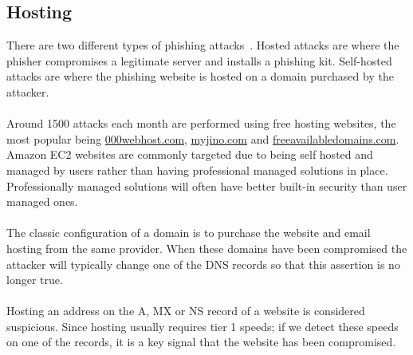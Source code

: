 \documentclass[12pt,twoside]{report}
\begin{document}
\subsection{Hosting}\label{hosting}
There are two different types of phishing attacks~\cite{freephish}. Hosted attacks are where the phisher compromises a legitimate server and installs a phishing kit. Self-hosted attacks are where the phishing website is hosted on a domain purchased by the attacker.
\\\\
Around 1500 attacks each month are performed using free hosting websites, the most popular being \url{000webhost.com}, \url{myjino.com} and \url{freeavailabledomains.com}.  Amazon EC2 websites are commonly targeted due to being self hosted and managed by users rather than having professional managed solutions in place. Professionally managed solutions will often have better built-in security than user managed ones.
\\\\
The classic configuration of a domain is to purchase the website and email hosting from the same provider. When these domains have been compromised the attacker will typically change one of the DNS records so that this assertion is no longer true. 
\\\\
Hosting an address on the A, MX or NS record of a website is considered suspicious. Since hosting usually requires tier 1 speeds; if we detect these speeds on one of the records, it is a key signal that the website has been compromised. 
\end{document}
